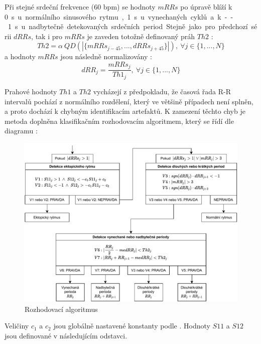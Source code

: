 Při stejné srdeční frekvence (60 bpm) se hodnoty $mRRs$ po úpravě blíží k
0~\si\s~u normálního sinusového rytmu, 1~\si\s~ u vynechaných cyklů a k
--1~\si\s~ u nadbytečně detekovaných srdečních period. Stejně jako pro předchozí
sérii $dRRs$, tak i pro $mRRs$ je zaveden totožně definovaný práh $Th2$
\cite{Lipponen2019}:
\begin{equation}
    Th2 = \alpha~QD(|\{mRRs_{j-45},...,dRRs_{j+45}\}|), ~\forall j \in \{1,...,N\}
\end{equation}
a hodnoty $mRRs$ jsou následně normalizovány \cite{Lipponen2019}:
\begin{equation}
    dRR_j = \frac{mRRs_j}{Th1_j}, ~\forall j \in \{1,...,N\}
\end{equation}

Prahové hodnoty $Th1$ a $Th2$ vycházejí z předpokladu, že časová řada R-R
intervalů pochází z normálního rozdělení, který ve většině případech není
splněn, a proto dochází k chybným identifikacím artefaktů. K zamezení těchto
chyb je metoda doplněna klasifikačním rozhodovacím algoritmem, který se řídí dle
diagramu \cite{Lipponen2019}:

\begin{figure}[h]
    \begin{center}
        \includegraphics[width=1\textwidth]{../assets/diagrams/rr_decision}
        \caption{Rozhodovací algoritmus \cite{Lipponen2019}}
        \label{fig:rr_decision}
    \end{center}
\end{figure}

Veličiny $c_1$ a $c_2$ jsou globálně nastavené konstanty podle
\cite{Lipponen2019}. Hodnoty $S11$ a $S12$ jsou definované v následujícím
odstavci.

